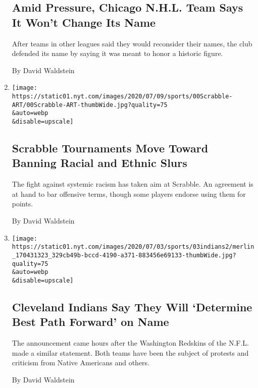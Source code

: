\begin{enumerate}
  \hypertarget{amid-pressure-chicago-nhl-team-says-it-wont-change-its-name}{%
  \subsection{Amid Pressure, Chicago N.H.L. Team Says It Won't Change
  Its
  Name}\label{amid-pressure-chicago-nhl-team-says-it-wont-change-its-name}}

  After teams in other leagues said they would reconsider their names,
  the club defended its name by saying it was meant to honor a historic
  figure.

  By David Waldstein
\item
  \href{/2020/07/07/sports/scrabble-racial-slurs-tournaments.html}{}

  \texttt{[image: https://static01.nyt.com/images/2020/07/09/sports/00Scrabble-ART/00Scrabble-ART-thumbWide.jpg?quality=75\\\&auto=webp\\\&disable=upscale]}

  \hypertarget{scrabble-tournaments-move-toward-banning-racial-and-ethnic-slurs}{%
  \subsection{Scrabble Tournaments Move Toward Banning Racial and Ethnic
  Slurs}\label{scrabble-tournaments-move-toward-banning-racial-and-ethnic-slurs}}

  The fight against systemic racism has taken aim at Scrabble. An
  agreement is at hand to bar offensive terms, though some players
  endorse using them for points.

  By David Waldstein
\item
  \href{/2020/07/03/sports/baseball/cleveland-indians-name-change.html}{}

  \texttt{[image: https://static01.nyt.com/images/2020/07/03/sports/03indians2/merlin\_170431323\_329cb49b-bccd-4190-a371-883456e69133-thumbWide.jpg?quality=75\\\&auto=webp\\\&disable=upscale]}

  \hypertarget{cleveland-indians-say-they-will-determine-best-path-forward-on-name}{%
  \subsection{Cleveland Indians Say They Will `Determine Best Path
  Forward' on
  Name}\label{cleveland-indians-say-they-will-determine-best-path-forward-on-name}}

  The announcement came hours after the Washington Redskins of the
  N.F.L. made a similar statement. Both teams have been the subject of
  protests and criticism from Native Americans and others.

  By David Waldstein
\end{enumerate}

